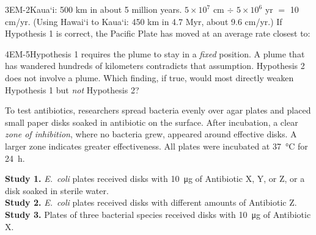 \documentclass[11pt]{article}
\begin{document}
\begin{q}{3}{EM-2}{Kaua`i: 500 km in about 5 million years. $5\times10^{7}$ cm $\div$ $5\times10^{6}$ yr $=$ 10 cm/yr. (Using Hawai`i to Kaua`i: 450 km in 4.7 Myr, about 9.6 cm/yr.)}
If Hypothesis 1 is correct, the Pacific Plate has moved at an average rate closest to:
\end{q}

\begin{q}{4}{EM-5}{Hypothesis 1 requires the plume to stay in a \emph{fixed} position. A plume that has wandered hundreds of kilometers contradicts that assumption. Hypothesis 2 does not involve a plume.}
Which finding, if true, would most directly weaken Hypothesis 1 but \emph{not} Hypothesis 2?
\end{q}

To test antibiotics, researchers spread bacteria evenly over agar plates and placed small paper disks soaked in antibiotic on the surface. After incubation, a clear \emph{zone of inhibition}, where no bacteria grew, appeared around effective disks. A larger zone indicates greater effectiveness. All plates were incubated at \SI{37}{\celsius} for \SI{24}{\hour}.

\textbf{Study 1.} \textit{E.\ coli} plates received disks with \SI{10}{\micro\gram} of Antibiotic X, Y, or Z, or a disk soaked in sterile water.\\
\textbf{Study 2.} \textit{E.\ coli} plates received disks with different amounts of Antibiotic Z.\\
\textbf{Study 3.} Plates of three bacterial species received disks with \SI{10}{\micro\gram} of Antibiotic X.
\end{document}
